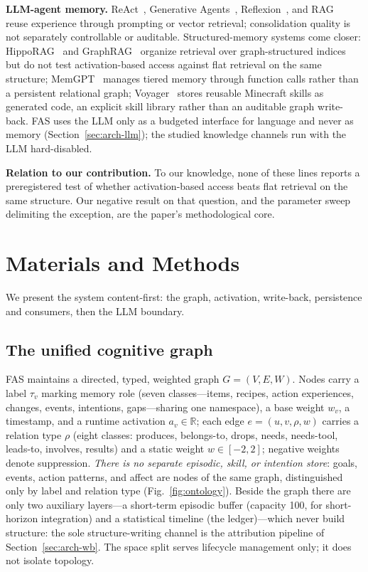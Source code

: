 \documentclass[10pt]{article}
\begin{document}
\textbf{LLM-agent memory.} ReAct~\citep{yao2023react}, Generative Agents~\citep{park2023generative}, Reflexion~\citep{shinn2023reflexion}, and RAG~\citep{lewis2020rag} reuse experience through prompting or vector retrieval; consolidation quality is not separately controllable or auditable. Structured-memory systems come closer: HippoRAG~\citep{gutierrez2024hipporag} and GraphRAG~\citep{edge2024graphrag} organize retrieval over graph-structured indices but do not test activation-based access against flat retrieval on the same structure; MemGPT~\citep{packer2023memgpt} manages tiered memory through function calls rather than a persistent relational graph; Voyager~\citep{wang2023voyager} stores reusable Minecraft skills as generated code, an explicit skill library rather than an auditable graph write-back. FAS uses the LLM only as a budgeted interface for language and never as memory (Section~\ref{sec:arch-llm}); the studied knowledge channels run with the LLM hard-disabled.

\textbf{Relation to our contribution.} To our knowledge, none of these lines reports a preregistered test of whether activation-based access beats flat retrieval on the same structure. Our negative result on that question, and the parameter sweep delimiting the exception, are the paper's methodological core.

\section{Materials and Methods}
\label{sec:arch}

We present the system content-first: the graph, activation, write-back, persistence and consumers, then the LLM boundary.

\subsection{The unified cognitive graph}
\label{sec:arch-graph}
FAS maintains a directed, typed, weighted graph $G=(V,E,W)$. Nodes carry a label $\tau_v$ marking memory role (seven classes---items, recipes, action experiences, changes, events, intentions, gaps---sharing one namespace), a base weight $w_v$, a timestamp, and a runtime activation $a_v\in\mathbb{R}$; each edge $e=(u,v,\rho,w)$ carries a relation type $\rho$ (eight classes: produces, belongs-to, drops, needs, needs-tool, leads-to, involves, results) and a static weight $w\in[-2,2]$; negative weights denote suppression. \emph{There is no separate episodic, skill, or intention store}: goals, events, action patterns, and affect are nodes of the same graph, distinguished only by label and relation type (Fig.~\ref{fig:ontology}). Beside the graph there are only two auxiliary layers---a short-term episodic buffer (capacity 100, for short-horizon integration) and a statistical timeline (the ledger)---which never build structure: the sole structure-writing channel is the attribution pipeline of Section~\ref{sec:arch-wb}. The space split serves lifecycle management only; it does not isolate topology.
\end{document}
